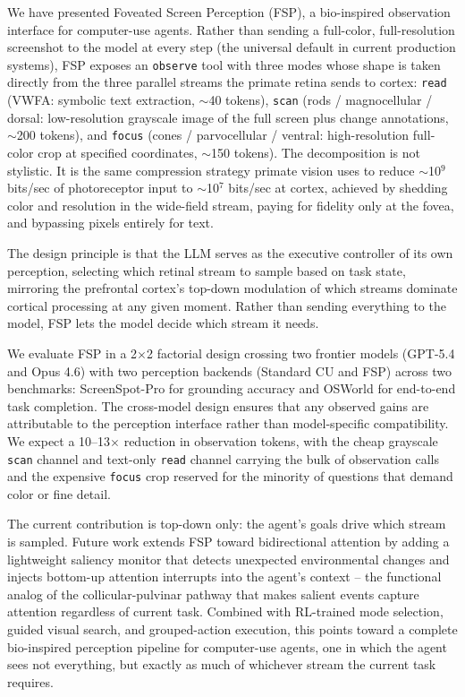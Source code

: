 \documentclass[11pt,a4paper]{article}
\begin{document}
We have presented Foveated Screen Perception (FSP), a bio-inspired observation interface for computer-use agents. Rather than sending a full-color, full-resolution screenshot to the model at every step (the universal default in current production systems), FSP exposes an \texttt{observe} tool with three modes whose shape is taken directly from the three parallel streams the primate retina sends to cortex: \texttt{read} (VWFA: symbolic text extraction, $\sim$40 tokens), \texttt{scan} (rods / magnocellular / dorsal: low-resolution grayscale image of the full screen plus change annotations, $\sim$200 tokens), and \texttt{focus} (cones / parvocellular / ventral: high-resolution full-color crop at specified coordinates, $\sim$150 tokens). The decomposition is not stylistic. It is the same compression strategy primate vision uses to reduce $\sim$10$^9$ bits/sec of photoreceptor input to $\sim$10$^7$ bits/sec at cortex, achieved by shedding color and resolution in the wide-field stream, paying for fidelity only at the fovea, and bypassing pixels entirely for text.

The design principle is that the LLM serves as the executive controller of its own perception, selecting which retinal stream to sample based on task state, mirroring the prefrontal cortex's top-down modulation of which streams dominate cortical processing at any given moment. Rather than sending everything to the model, FSP lets the model decide which stream it needs.

We evaluate FSP in a 2$\times$2 factorial design crossing two frontier models (GPT-5.4 and Opus 4.6) with two perception backends (Standard CU and FSP) across two benchmarks: ScreenSpot-Pro for grounding accuracy and OSWorld for end-to-end task completion. The cross-model design ensures that any observed gains are attributable to the perception interface rather than model-specific compatibility. We expect a 10--13$\times$ reduction in observation tokens, with the cheap grayscale \texttt{scan} channel and text-only \texttt{read} channel carrying the bulk of observation calls and the expensive \texttt{focus} crop reserved for the minority of questions that demand color or fine detail.

The current contribution is top-down only: the agent's goals drive which stream is sampled. Future work extends FSP toward bidirectional attention by adding a lightweight saliency monitor that detects unexpected environmental changes and injects bottom-up attention interrupts into the agent's context -- the functional analog of the collicular-pulvinar pathway that makes salient events capture attention regardless of current task. Combined with RL-trained mode selection, guided visual search, and grouped-action execution, this points toward a complete bio-inspired perception pipeline for computer-use agents, one in which the agent sees not everything, but exactly as much of whichever stream the current task requires.





\end{document}
